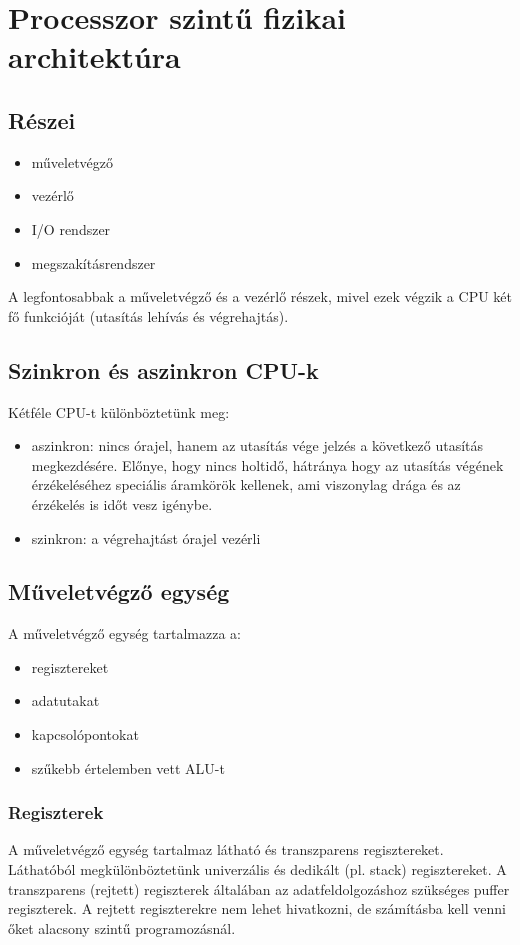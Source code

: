 
\chapter{Processzor szintű fizikai architektúra}

\section{Részei}
\begin{itemize}
    \item műveletvégző
    \item vezérlő
    \item I/O rendszer
    \item megszakításrendszer
\end{itemize}
A legfontosabbak a műveletvégző és a vezérlő részek, mivel ezek végzik a CPU két fő funkcióját (utasítás lehívás és végrehajtás).

\section{Szinkron és aszinkron CPU-k}
Kétféle CPU-t különböztetünk meg:
\begin{itemize}
    \item aszinkron: nincs órajel, hanem az utasítás vége jelzés a következő utasítás megkezdésére. Előnye, hogy nincs holtidő, hátránya hogy az utasítás végének érzékeléséhez speciális áramkörök kellenek, ami viszonylag drága és az érzékelés is időt vesz igénybe.
    \item szinkron: a végrehajtást órajel vezérli
\end{itemize}

\section{Műveletvégző egység}
A műveletvégző egység tartalmazza a:
\begin{itemize}
    \item regisztereket
    \item adatutakat
    \item kapcsolópontokat
    \item szűkebb értelemben vett ALU-t
\end{itemize}

\subsection{Regiszterek}
A műveletvégző egység tartalmaz látható és transzparens regisztereket.
Láthatóból megkülönböztetünk univerzális és dedikált (pl. stack) regisztereket.
A transzparens (rejtett) regiszterek általában az adatfeldolgozáshoz szükséges puffer regiszterek.
A rejtett regiszterekre nem lehet hivatkozni, de számításba kell venni őket alacsony szintű programozásnál.

